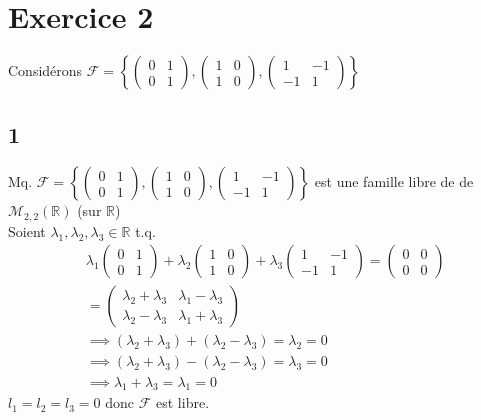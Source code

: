 \documentclass[11pt]{exam}
\newcommand{\R}{\mathbb{R}}
\newcommand{\0}{\mathbb{0}}
\begin{document}
\section*{Exercice 2}
Considérons $\mathcal{F} = \left\{\begin{pmatrix}0&1\\0&1\end{pmatrix}, \begin{pmatrix}1&0\\1&0\end{pmatrix}, \begin{pmatrix}1&-1\\-1&1\end{pmatrix}\right\}$
\subsection*{1}
Mq. $\mathcal{F} = \left\{\begin{pmatrix}0&1\\0&1\end{pmatrix}, \begin{pmatrix}1&0\\1&0\end{pmatrix}, \begin{pmatrix}1&-1\\-1&1\end{pmatrix}\right\}$ est une famille libre de de $\mathcal{M}_{2,2}(\R)$ (sur $\R$)\\
Soient $\lambda_1, \lambda_2, \lambda_3 \in \R$ t.q.
\begin{align*}
    &\lambda_1\begin{pmatrix}0&1\\0&1\end{pmatrix} + \lambda_2\begin{pmatrix}1&0\\1&0\end{pmatrix} + \lambda_3\begin{pmatrix}1&-1\\-1&1\end{pmatrix} = \begin{pmatrix}0&0\\0&0\end{pmatrix}\\
    &= \begin{pmatrix}\lambda_2+\lambda_3&\lambda_1-\lambda_3\\\lambda_2-\lambda_3&\lambda_1+\lambda_3\end{pmatrix}\\
    &\implies (\lambda_2+\lambda_3) + (\lambda_2-\lambda_3) = \lambda_2 = 0\\
    &\implies (\lambda_2+\lambda_3) - (\lambda_2-\lambda_3) = \lambda_3 = 0\\
    &\implies \lambda_1 + \lambda_3 = \lambda_1 = 0
\end{align*}
$l_1 = l_2 = l_3 = 0$ donc $\mathcal{F}$ est libre.
\end{document}
